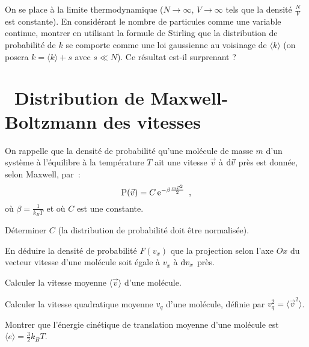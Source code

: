 \documentclass[utf8, 11pt]{feuille}
\begin{document}
\question
On se place à la limite thermodynamique ($N \to \infty$, $V \to \infty$ tels que la densité $\frac{N}{V}$ est constante). En considérant le nombre de particules comme une variable continue, montrer en utilisant la formule de Stirling que la distribution de probabilité de $k$ se comporte comme une loi gaussienne au voisinage de $\langle k \rangle$ (on posera $k = \langle k \rangle + s$ avec $s \ll N$). Ce résultat est-il surprenant ?



\section{\soft~Distribution de Maxwell-Boltzmann des vitesses}

On rappelle que la densité de probabilité qu'une molécule de masse $m$
d'un système à l'équilibre à la température $T$ ait une vitesse $\vec v$ à ${\rm d} {\vec v}$ près est donnée, selon
Maxwell, par~:
\begin{equation*}
\text{P}(\vec v) = C \,{\rm e}^{-\beta \frac{m\vec v^2}{2}}\enspace,
\end{equation*}
où $\beta=\frac{1}{k_B T}$ et où $C$ est une constante.

\medskip

\question
Déterminer $C$ (la distribution de probabilité doit être normalisée).

\question
En déduire la densité de probabilité $F(v_x)$ que la projection selon l'axe $Ox$ du vecteur vitesse d'une molécule soit égale à $v_x$ à ${\rm d}v_x$ près.\label{theocine2}

\question
Calculer la vitesse moyenne $\langle \vec v\rangle$ d'une molécule.

\question
Calculer la vitesse quadratique moyenne $v_q$ d'une molécule, définie par $v_q^2=\langle {\vec v^2}\rangle$.

\question
Montrer que l'énergie cinétique de translation moyenne d'une molécule est $\langle e \rangle = \frac32 k_B T$.
\end{document}

